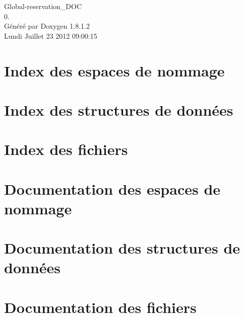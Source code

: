 \documentclass{book}
\begin{document}
\hypersetup{pageanchor=false,citecolor=blue}
\begin{titlepage}
\vspace*{7cm}
\begin{center}
{\Large Global-\/reservation\-\_\-\-D\-O\-C \\[1ex]\large 0. }\\
\vspace*{1cm}
{\large Généré par Doxygen 1.8.1.2}\\
\vspace*{0.5cm}
{\small Lundi Juillet 23 2012 09:00:15}\\
\end{center}
\end{titlepage}
\clearemptydoublepage
{}
\tableofcontents
\clearemptydoublepage
{}
\hypersetup{pageanchor=true,citecolor=blue}
\chapter{Index des espaces de nommage}

\chapter{Index des structures de données}

\chapter{Index des fichiers}

\chapter{Documentation des espaces de nommage}



\chapter{Documentation des structures de données}








\chapter{Documentation des fichiers}








\printindex
\end{document}
